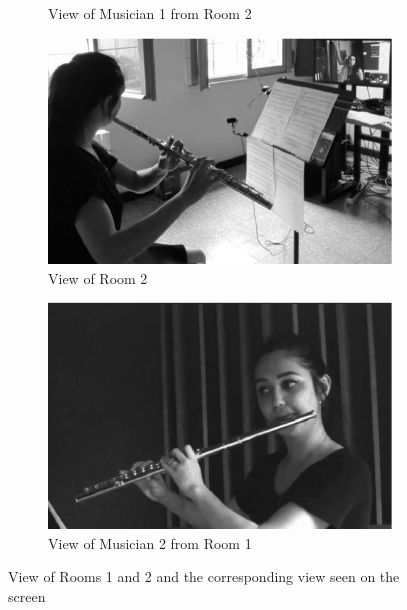 \begin{figure}[t]
\begin{subfigure}[t]{\columnwidth}
	\caption{View of Musician 1 from Room 2}
	\label{subfig:av}
	\end{subfigure}
    \begin{subfigure}[t]{\columnwidth}
	\centering        
	\includegraphics[width=\textwidth]{img/fs.eps}
		\caption{View of Room 2}
	\label{subfig:fs}
	\end{subfigure}
	\begin{subfigure}[t]{\columnwidth}
	\centering        
	\includegraphics[width=\textwidth]{img/fv.eps}
	\caption{View of Musician 2 from Room 1}
	\label{subfig:fv}
\end{subfigure}

	\quad 
	\caption{View of Rooms 1 and 2 and the corresponding view seen on the screen}\label{fig:afsv}

\end{figure}

